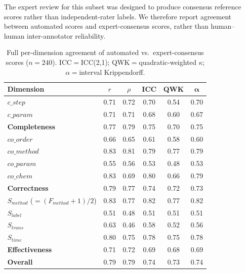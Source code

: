 \documentclass[conference]{IEEEtran}
\begin{document}
The expert review for this subset was designed to produce consensus reference
scores rather than independent-rater labels. We therefore report agreement
between automated scores and expert-consensus scores, rather than human--human
inter-annotator reliability.

\begin{table}[htbp]
    \centering
    \caption{Full per-dimension agreement of automated vs.\ expert-consensus
    scores ($n{=}240$). ICC${=}$ICC(2,1); QWK${=}$quadratic-weighted $\kappa$;
    $\alpha{=}$interval Krippendorff.}
    \label{tab:calibfull}
    \small
    \begin{tabular}{l c c c c c}
        \toprule
        \textbf{Dimension} & $r$ & $\rho$ & \textbf{ICC} & \textbf{QWK} & $\boldsymbol{\alpha}$ \\
        \midrule
        $c\_step$  & 0.71 & 0.72 & 0.70 & 0.54 & 0.70 \\
        $c\_param$ & 0.71 & 0.71 & 0.68 & 0.60 & 0.67 \\
        \textbf{Completeness} & 0.77 & 0.79 & 0.75 & 0.70 & 0.75 \\
        \midrule
        $co\_order$  & 0.66 & 0.65 & 0.61 & 0.58 & 0.60 \\
        $co\_method$ & 0.83 & 0.81 & 0.79 & 0.77 & 0.79 \\
        $co\_param$  & 0.55 & 0.56 & 0.53 & 0.48 & 0.53 \\
        $co\_chem$   & 0.83 & 0.69 & 0.80 & 0.66 & 0.79 \\
        \textbf{Correctness} & 0.79 & 0.77 & 0.74 & 0.72 & 0.73 \\
        \midrule
        $S_{method}$ ($=\!(F_{method}\!+\!1)/2$) & 0.83 & 0.77 & 0.82 & 0.77 & 0.82 \\
        $S_{label}$  & 0.51 & 0.48 & 0.51 & 0.51 & 0.51 \\
        $S_{trans}$  & 0.63 & 0.46 & 0.58 & 0.52 & 0.56 \\
        $S_{time}$   & 0.80 & 0.75 & 0.78 & 0.75 & 0.78 \\
        \textbf{Effectiveness} & 0.71 & 0.72 & 0.69 & 0.68 & 0.69 \\
        \midrule
        \textbf{Overall} & 0.79 & 0.79 & 0.74 & 0.73 & 0.74 \\
        \bottomrule
    \end{tabular}
\end{table}



\end{document}
